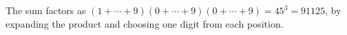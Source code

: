 The sum factors as $(1+\cdots+9)(0+\cdots+9)(0+\cdots+9)=45^3=\boxed{91125}$, by expanding the product and choosing one digit from each position.
